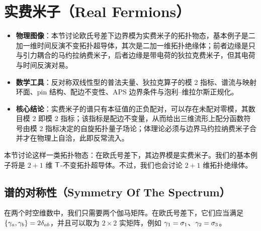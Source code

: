 
\section{实费米子（Real Fermions）}\label{realf}

\begin{keytakeaways}
\begin{itemize}[leftmargin=1.6em,itemsep=0.2em,topsep=0.2em]
  \item \textbf{物理图像}：本节讨论欧氏号差下边界模为实费米子的拓扑物态，基本例子是二加一维时间反演不变拓扑超导体，其次是二加一维拓扑绝缘体；前者边缘是只与引力耦合的马约拉纳费米子，后者边缘是带电荷的狄拉克费米子，但其电荷与时间反演对易。
  \item \textbf{数学工具}：反对称双线性型的普法夫量、狄拉克算子的模 2 指标、谱流与映射环面、pin 结构、配边不变性、APS 边界条件与泡利--维拉尔斯正规化。
  \item \textbf{核心结论}：实费米子的谱只有本征值的正负配对，可以存在未配对零模，其数目模 2 即模 2 指标；该指标是配边不变量，从而给出三维流形上配分函数符号由模 2 指标决定的自旋拓扑量子场论；体理论必须与边界马约拉纳费米子合并才在物理上自洽，此即反常流入。
\end{itemize}
\end{keytakeaways}

本节讨论这样一类拓扑物态：在欧氏号差下，其边界模是实费米子。我们的基本例子将是 $2+1$ 维 ${\sf T}$-不变拓扑超导体。不过，我们也会讨论 $2+1$ 维拓扑绝缘体。

\subsection{谱的对称性（Symmetry Of The Spectrum）}\label{rsf}

在两个时空维数中，我们只需要两个伽马矩阵。在欧氏号差下，它们应当满足 $\{{\gamma}_a,{\gamma}_b\}=2\delta_{ab}$，并且可以取为 $2\times 2$ 实矩阵，例如 ${\gamma}_1=\sigma_1$、${\gamma}_2=\sigma_3$。


